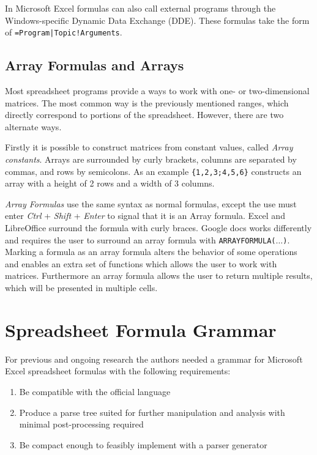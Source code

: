 \documentclass[conference]{IEEEtran}
\begin{document}
In Microsoft Excel formulas can also call external programs through the Windows-specific Dynamic Data Exchange (DDE).
These formulas take the form of \texttt{=Program|Topic!Arguments}.

\subsection{Array Formulas and Arrays}
\label{sec:arrayformulas}
Most spreadsheet programs provide a ways to work with one- or two-dimensional matrices.
The most common way is the previously mentioned ranges, which directly correspond to portions of the spreadsheet.
However, there are two alternate ways.

Firstly it is possible to construct matrices from constant values, called \emph{Array constants}.
Arrays are surrounded by curly brackets, columns are separated by commas, and rows by semicolons.
As an example \texttt{\{1,2,3;4,5,6\}} constructs an array with a height of 2 rows and a width of 3 columns.

\emph{Array Formulas} use the same syntax as normal formulas, except the use must enter \emph{Ctrl} + \emph{Shift} + \emph{Enter} to signal that it is an Array formula.
Excel and LibreOffice surround the formula with curly braces.
Google docs works differently and requires the user to surround an array formula with \texttt{ARRAYFORMULA($\ldots$)}.
Marking a formula as an array formula alters the behavior of some operations and enables an extra set of functions which allows the user to work with matrices.
Furthermore an array formula allows the user to return multiple results, which will be presented in multiple cells.

\section{Spreadsheet Formula Grammar}
\label{section:grammar}

For previous and ongoing research the authors needed a grammar for Microsoft Excel spreadsheet formulas with the following requirements:

\label{sec:designgoals}
\begin{enumerate}
\item Be compatible with the official language
\item Produce a parse tree suited for further manipulation and analysis with minimal post-processing required
\item Be compact enough to feasibly implement with a parser generator
\end{enumerate}
\end{document}
